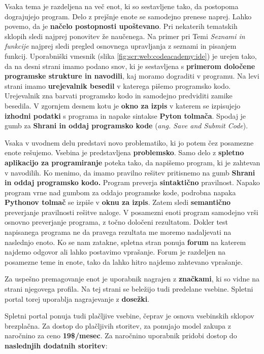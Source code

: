 Vsaka tema je razdeljena na več enot, ki so sestavljene tako, da
postopoma dograjujejo program. Delo z prejšnje enote se samodejno
prenese naprej. Lahko povemo, da je \textbf{načelo postopnosti
upoštevano}. Pri nekaterih tematskih sklopih sledi najprej ponovitev že
naučenega. Na primer pri Temi \emph{Seznami in funkcije} najprej sledi
pregled osnovnega upravljanja z seznami in pisanjem funkcij.
Uporabniški vmesnik (slika \ref{fig:scr:web:codeacademy:ide}) je
urejen tako, da na desni strani imamo podano snov, ki je sestavljena s
\textbf{primerom določene programske strukture in navodili}, kaj
moramo dograditi v programu. Na levi strani imamo \textbf{urejevalnik
  besedil} v katerega pišemo programsko kodo. Urejevalnik zna barvati
programsko kodo in samodejno predviditi zamike besedila. V zgornjem
desnem kotu je \textbf{okno za izpis} v katerem se izpisujejo
\textbf{izhodni podatki} s programa in napake sintakse \textbf{Pyton
  tolmača}. Spodaj je gumb za \textbf{Shrani in oddaj programsko kode}
(\emph{ang. Save and Submit Code}).

Vsaka v uvodnem delu predstavi novo problematiko, ki jo potem čez
posamezne enote rešujemo. Vsebina je predstavljena
\textbf{problemsko}. Samo delo z \textbf{spletno aplikacijo za
  programiranje} poteka tako, da napišemo program, ki je zahtevan v
navodilih. Ko menimo, da imamo pravilno rešitev pritisnemo na gumb
\textbf{Shrani in oddaj programsko kodo.} Program preverja
\textbf{sintaktično} pravilnost. Napako program vrne nad gumbom za
oddajo programske kode, podrobna napaka \textbf{Pythonov tolmač} se
izpiše v \textbf{oknu za izpis}. Zatem sledi \textbf{semantično}
preverjanje pravilnosti rešitve naloge. V posamezni enoti program
samodejno vrši osnovno preverjanje programa, z točno določeni
rezultatom. Dokler test napisanega programa ne da pravega rezultata me
moremo nadaljevati na naslednjo enoto. Ko se nam zatakne, spletna
stran ponuja \textbf{forum} na katerem najdemo odgovor ali lahko
postavimo vprašanje. Forum je razdeljen na posamezne teme in enote,
tako da lahko hitro najdemo zahtevano vprašanje.

Za uspešno premagovanje enot je uporabnik nagrajen z
\textbf{značkami}, ki so vidne na strani njegovega profila. Na tej
strani se beležijo tudi predelane vsebine. Spletni portal torej
uporablja nagrajevanje z \textbf{dosežki}.

Spletni portal ponuja tudi plačljive vsebine, čeprav je osnova
vsebinskih sklopov brezplačna. Za dostop do plačljivih storitev, za
ponujajo model zakupa z naročnino za ceno \textbf{19\$/mesec}. Za
naročnino uporabnik pridobi dostop do\textbf{ naslednjih dodatnih
  storitev}:

